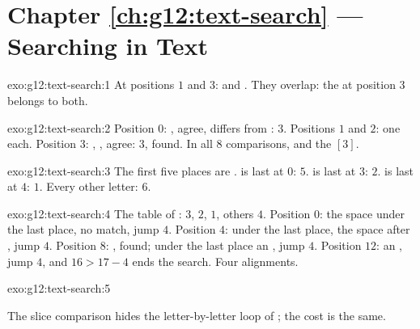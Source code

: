 \section*{Chapter \ref{ch:g12:text-search} --- Searching in Text}

\begin{solution}{exo:g12:text-search:1}
At positions $1$ and $3$:  and . They overlap: the  at position $3$ belongs to
both.
\end{solution}

\begin{solution}{exo:g12:text-search:2}
Position $0$: ,  agree,  differs from : $3$. Positions $1$ and $2$: one each. Position
$3$: , ,  agree: $3$, found. In all $8$ comparisons, and the  $[3]$.
\end{solution}

\begin{solution}{exo:g12:text-search:3}
The first five places are .  is last at $0$: $5$.  is last at $3$: $2$.  is last at
$4$: $1$. Every other letter: $6$.
\end{solution}

\begin{solution}{exo:g12:text-search:4}
The table of :  $3$,  $2$,  $1$, others $4$. Position $0$: the space under the last
place, no match, jump $4$. Position $4$: under the last place, the space after , jump $4$. Position $8$:
, found; under the last place an , jump $4$. Position $12$: an , jump $4$, and $16 > 17 - 4$
ends the search. Four alignments.
\end{solution}

\begin{solution}{exo:g12:text-search:5}
\smallskip\noindent\hspace*{2em}

\noindent\hspace*{4em}

\noindent\hspace*{4em}

\noindent\hspace*{6em}

\noindent\hspace*{8em}

\noindent\hspace*{4em}

\smallskip\noindent The slice comparison hides the letter-by-letter loop of ; the cost is the same.
\end{solution}

